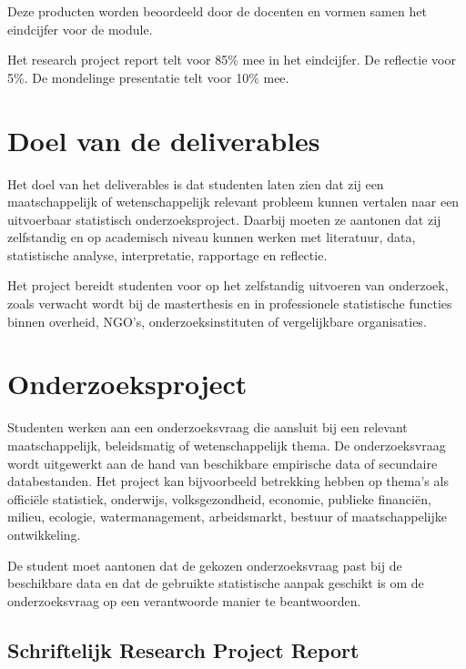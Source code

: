 \documentclass[
  letterpaper,
  DIV=11,
  numbers=noendperiod]{scrreprt}
\begin{document}
Deze producten worden beoordeeld door de docenten en vormen samen het
eindcijfer voor de module.

Het research project report telt voor 85\% mee in het eindcijfer. De
reflectie voor 5\%. De mondelinge presentatie telt voor 10\% mee.

\section*{Doel van de deliverables}\label{doel-van-de-deliverables}


Het doel van het deliverables is dat studenten laten zien dat zij een
maatschappelijk of wetenschappelijk relevant probleem kunnen vertalen
naar een uitvoerbaar statistisch onderzoeksproject. Daarbij moeten ze
aantonen dat zij zelfstandig en op academisch niveau kunnen werken met
literatuur, data, statistische analyse, interpretatie, rapportage en
reflectie.

Het project bereidt studenten voor op het zelfstandig uitvoeren van
onderzoek, zoals verwacht wordt bij de masterthesis en in professionele
statistische functies binnen overheid, NGO's, onderzoeksinstituten of
vergelijkbare organisaties.

\section*{Onderzoeksproject}\label{sec-deliv}


Studenten werken aan een onderzoeksvraag die aansluit bij een relevant
maatschappelijk, beleidsmatig of wetenschappelijk thema. De
onderzoeksvraag wordt uitgewerkt aan de hand van beschikbare empirische
data of secundaire databestanden. Het project kan bijvoorbeeld
betrekking hebben op thema's als officiële statistiek, onderwijs,
volksgezondheid, economie, publieke financiën, milieu, ecologie,
watermanagement, arbeidsmarkt, bestuur of maatschappelijke ontwikkeling.

De student moet aantonen dat de gekozen onderzoeksvraag past bij de
beschikbare data en dat de gebruikte statistische aanpak geschikt is om
de onderzoeksvraag op een verantwoorde manier te beantwoorden.

\subsection*{Schriftelijk Research Project Report}\label{sec-resrep}
\end{document}
